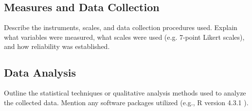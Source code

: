 \subsection{Measures and Data Collection}
Describe the instruments, scales, and data collection procedures used. Explain what variables were measured, what scales were used (e.g. 7-point Likert scales), and how reliability was established.

\subsection{Data Analysis}
Outline the statistical techniques or qualitative analysis methods used to analyze the collected data. Mention any software packages utilized (e.g., R version 4.3.1 \parencite{RCore2023}).
